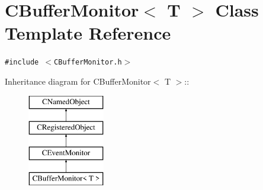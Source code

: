 \section{CBuffer\-Monitor$<$ T $>$  Class Template Reference}
\label{classCBufferMonitor}
{\tt \#include $<$CBuffer\-Monitor.h$>$}

Inheritance diagram for CBuffer\-Monitor$<$ T $>$::\begin{figure}[H]
\begin{center}
\leavevmode
\includegraphics[height=4cm]{classCBufferMonitor}
\end{center}
\end{figure}
